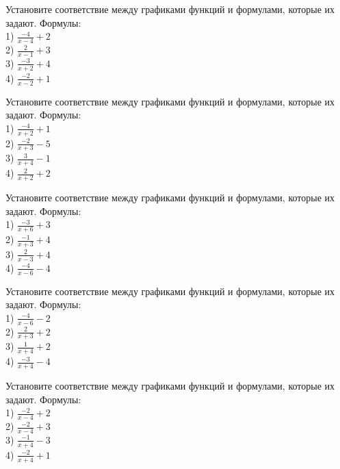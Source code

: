\documentclass[4apaper]{article}
\begin{document}
\begin{taskBN}{76}
Установите соответствие между графиками функций и формулами, которые их задают. Формулы: \\1) $\frac{-4}{x-4}+2$\\2) $\frac{2}{x-1}+3$\\3) $\frac{-3}{x+2}+4$\\4) $\frac{-2}{x-2}+1$
\end{taskBN}

\begin{taskBN}{77}
Установите соответствие между графиками функций и формулами, которые их задают. Формулы: \\1) $\frac{-4}{x+2}+1$\\2) $\frac{-2}{x+3}-5$\\3) $\frac{3}{x+4}-1$\\4) $\frac{2}{x+2}+2$
\end{taskBN}

\begin{taskBN}{78}
Установите соответствие между графиками функций и формулами, которые их задают. Формулы: \\1) $\frac{-3}{x+6}+3$\\2) $\frac{-1}{x+3}+4$\\3) $\frac{2}{x-3}+4$\\4) $\frac{-4}{x-6}-4$
\end{taskBN}

\begin{taskBN}{79}
Установите соответствие между графиками функций и формулами, которые их задают. Формулы: \\1) $\frac{-4}{x-6}-2$\\2) $\frac{2}{x+3}+2$\\3) $\frac{1}{x+4}+2$\\4) $\frac{-3}{x+4}-4$
\end{taskBN}

\begin{taskBN}{80}
Установите соответствие между графиками функций и формулами, которые их задают. Формулы: \\1) $\frac{-2}{x-4}+2$\\2) $\frac{-2}{x-4}+3$\\3) $\frac{-1}{x+4}-3$\\4) $\frac{-2}{x+4}+1$
\end{taskBN}
\end{document}
